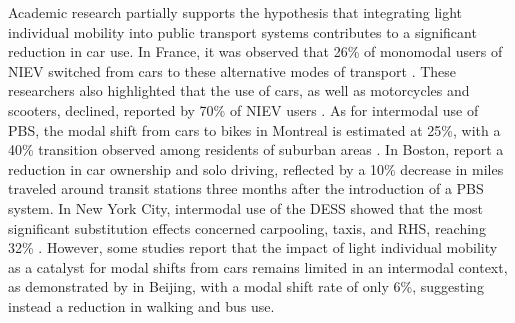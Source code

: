 \begin{refsegment}
Academic research partially supports the hypothesis that integrating light individual mobility into public transport systems contributes to a significant reduction in car use. In France, it was observed that 26\% of monomodal users of \acrshort{NIEV} switched from cars to these alternative modes of transport \textcolor{blue}{\autocite[14]{pages_nouveaux_2021}}. These researchers also highlighted that the use of cars, as well as motorcycles and scooters, declined, reported by 70\% of \acrshort{NIEV} users \textcolor{blue}{\autocite[13]{pages_nouveaux_2021}}. As for intermodal use of \acrshort{PBS}, the modal shift from cars to bikes in Montreal is estimated at 25\%, with a 40\% transition observed among residents of suburban areas \textcolor{blue}{\autocite[114]{bachand-marleau_much-anticipated_2011}}. In Boston, \textcolor{blue}{\textcite[14]{basu_planning_2021}} report a reduction in car ownership and solo driving, reflected by a 10\% decrease in miles traveled around transit stations three months after the introduction of a \acrshort{PBS} system. In New York City, intermodal use of the \acrshort{DESS} showed that the most significant substitution effects concerned carpooling, taxis, and \acrshort{RHS}, reaching 32\% \textcolor{blue}{\autocite[25]{lee_forecasting_2021}}. However, some studies report that the impact of light individual mobility as a catalyst for modal shifts from cars remains limited in an intermodal context, as demonstrated by \textcolor{blue}{\textcite[12]{fan_how_2019}} in Beijing, with a modal shift rate of only 6\%, suggesting instead a reduction in walking and bus use.%


\end{refsegment}
